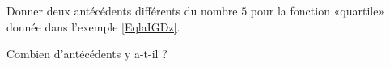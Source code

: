 
\begin{exercice}\label{exoSeconde-0053}

    Donner deux antécédents différents du nombre \( 5\) pour la fonction «quartile» donnée dans l'exemple \ref{EqlaIGDz}.

    Combien d'antécédents y a-t-il ?

\end{exercice}
